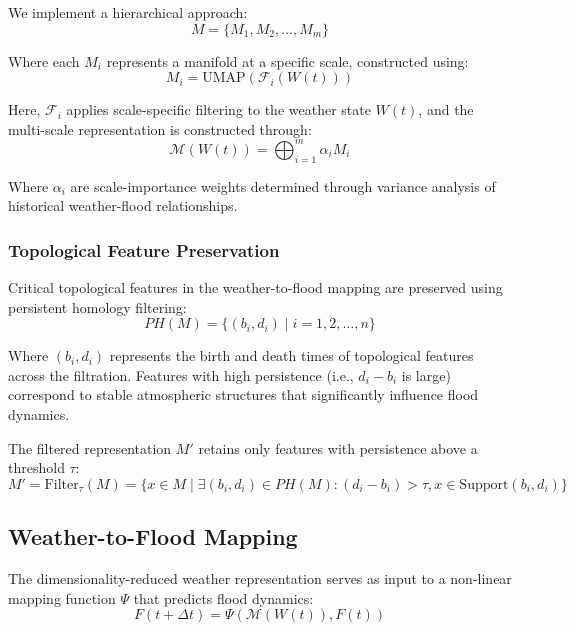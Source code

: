 \documentclass{article}
\begin{document}
We implement a hierarchical approach:
\begin{equation}
M = \{M_1, M_2, \ldots, M_m\}
\end{equation}

Where each $M_i$ represents a manifold at a specific scale, constructed using:
\begin{equation}
M_i = \text{UMAP}(\mathcal{F}_i(W(t)))
\end{equation}

Here, $\mathcal{F}_i$ applies scale-specific filtering to the weather state $W(t)$, and the multi-scale representation is constructed through:
\begin{equation}
\mathcal{M}(W(t)) = \bigoplus_{i=1}^{m} \alpha_i M_i
\end{equation}

Where $\alpha_i$ are scale-importance weights determined through variance analysis of historical weather-flood relationships.

\subsubsection{Topological Feature Preservation}
Critical topological features in the weather-to-flood mapping are preserved using persistent homology filtering:
\begin{equation}
PH(M) = \{(b_i, d_i) \mid i = 1, 2, \ldots, n\}
\end{equation}

Where $(b_i, d_i)$ represents the birth and death times of topological features across the filtration. Features with high persistence (i.e., $d_i - b_i$ is large) correspond to stable atmospheric structures that significantly influence flood dynamics.

The filtered representation $M'$ retains only features with persistence above a threshold $\tau$:
\begin{equation}
M' = \text{Filter}_\tau(M) = \{x \in M \mid \exists (b_i, d_i) \in PH(M) : (d_i - b_i) > \tau, x \in \text{Support}(b_i, d_i)\}
\end{equation}

\subsection{Weather-to-Flood Mapping}
The dimensionality-reduced weather representation serves as input to a non-linear mapping function $\Psi$ that predicts flood dynamics:
\begin{equation}
F(t+\Delta t) = \Psi(\mathcal{M}(W(t)), F(t))
\end{equation}
\end{document}
